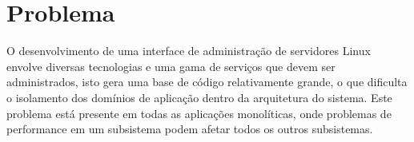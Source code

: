 \section{Problema}

  O desenvolvimento de uma interface de administração de servidores Linux
  envolve diversas tecnologias e uma gama de serviços que devem ser
  administrados, isto gera uma base de código relativamente grande, o que
  dificulta o isolamento dos domínios de aplicação dentro da arquitetura
  do sistema. Este problema está presente em todas as aplicações monolíticas,
  onde problemas de performance em um subsistema podem afetar todos
  os outros subsistemas.
